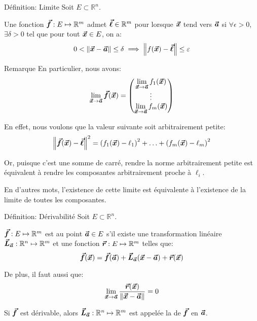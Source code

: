 \documentclass[a4paper]{article}
\begin{document}
\begin{parag}{Définition: Limite}
    Soit $E \subset \mathbb{R}^{n}$. 

    Une fonction $\bm{\protect\vec{f}} : E \mapsto \mathbb{R}^m$ admet $\bm{\protect\vec{\ell}} \in \mathbb{R}^m$ pour  lorsque $\bm{\protect\vec{x}}$ tend vers $\bm{\protect\vec{a}}$ si $\forall \epsilon > 0$, $\exists \delta > 0$ tel que pour tout $\bm{\protect\vec{x}} \in E$, on a: 
    \[0 < \left\|\bvec{x} - \bvec{a}\right\| \leq \delta \implies \left\|f\left(\bvec{x}\right) - \bvec{\ell}\right\| \leq \epsilon\]
    \begin{subparag}{Remarque}
        En particulier, nous avons: 
        \[\lim_{\bvec{x} \to \bvec{a}} \bvec{f}\left(\bvec{x}\right) = \begin{pmatrix} \lim\limits_{\bvec{x} \to \bvec{a}} f_1\left(\bvec{x}\right) \\ \vdots \\ \lim\limits_{\bvec{x} \to \bvec{a}} f_m\left(\bvec{x}\right) \end{pmatrix} \]
        
        En effet, nous voulons que la valeur suivante soit arbitrairement petite:
        \[\left\|\bvec{f}\left(\bvec{x}\right) - \bvec{\ell}\right\|^2 = \left(f_1\left(\bvec{x}\right) - \ell_1\right)^2 + \ldots + \left(f_m\left(\bvec{x}\right) - \ell_m\right)^2\]

        Or, puisque c'est une somme de carré, rendre la norme arbitrairement petite est équivalent à rendre les composantes arbitrairement proche à $\ell_i$.

        En d'autres mots, l'existence de cette limite est équivalente à l'existence de la limite de toutes les composantes.
    \end{subparag}
\end{parag}

\begin{parag}{Définition: Dérivabilité}
    Soit $E \subset \mathbb{R}^n$.

    $\bm{\protect\vec{f}}: E \mapsto \mathbb{R}^m$ est  au point $\bm{\protect\vec{a}} \in E$ s'il existe une transformation linéaire $\bm{\protect\vec{L}}_{\bm{\protect\vec{a}}}: \mathbb{R}^n \mapsto \mathbb{R}^m$ et une fonction $\bm{\protect\vec{r}}: E \mapsto \mathbb{R}^m$ telles que: 
    \[\bvec{f}\left(\bvec{x}\right) = \bvec{f}\left(\bvec{a}\right) + \bvec{L}_{\bvec{a}}\left(\bvec{x} - \bvec{a}\right) + \bvec{r}\left(\bvec{x}\right)\]

    De plus, il faut aussi que: 
    \[\lim_{\bvec{x} \to \bvec{a}} \frac{\bvec{r}\left(\bvec{x}\right)}{\left\|\bvec{x} - \bvec{a}\right\|} = 0\]
    
    Si $\bm{\protect\vec{f}}$ est dérivable, alors $\bm{\protect\vec{L}}_{\bm{\protect\vec{a}}}: \mathbb{R}^n \mapsto \mathbb{R}^m$ est appelée la  de $\bm{\protect\vec{f}}$ en $\bm{\protect\vec{a}}$.
\end{parag}
\end{document}
